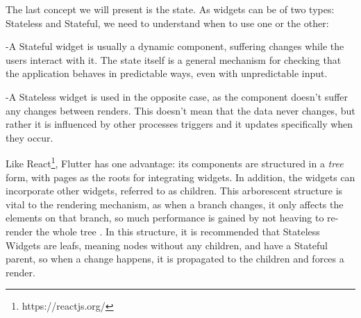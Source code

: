 The last concept we will present is the state. As widgets can be of two types: Stateless and Stateful, we need to understand when to use one or the other:

-A Stateful widget is usually a dynamic component, suffering changes while the users interact with it. The state itself is a general mechanism for checking that the application behaves in predictable ways, even with unpredictable input.

-A Stateless widget is used in the opposite case, as the component doesn’t suffer any changes between renders. This doesn’t mean that the data never changes, but rather it is influenced by other processes triggers and it updates specifically when they occur. 

Like React\footnote{https://reactjs.org/}, Flutter has one advantage: its components are structured in a \textit{tree} form, with pages as the roots for integrating widgets. In addition, the widgets can incorporate other widgets, referred to as children. This arborescent structure is vital to the rendering mechanism, as when a branch changes, it only affects the elements on that branch, so much performance is gained by not heaving to re-render the whole tree \cite{muller2021web}. In this structure, it is recommended that Stateless Widgets are leafs, meaning nodes without any children, and have a Stateful parent, so when a change happens, it is propagated to the children and forces a render.


